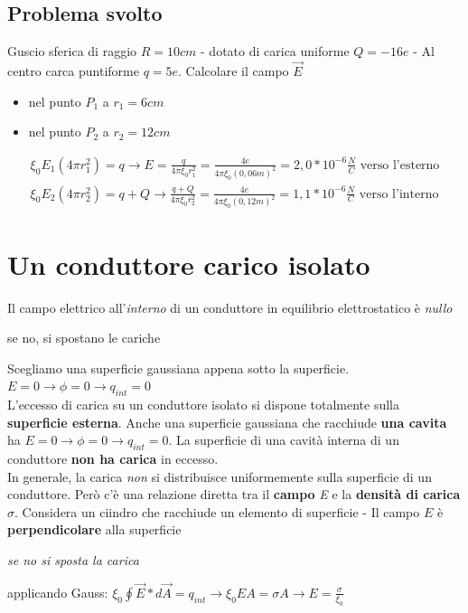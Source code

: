 \documentclass{book}
\begin{document}
\subsection{Problema svolto}
Guscio sferica di raggio $R=10cm$ - dotato di carica uniforme $Q=-16e$ - Al centro carca puntiforme $q=5e$. Calcolare il campo $\vec{E}$
\begin{itemize}
\item nel punto $P_1$ a $r_1=6cm$
\item nel punto $P_2$ a $r_2=12cm$
\end{itemize}
\begin{eqnarray*}
  \xi_0 E_1(4\pi r_1^2)=q\to E=\frac{q}{4\pi \xi_0 r^2_1}=\frac{4e}{4\pi \xi_0 (0,06m)^2}=2,0*10^{-6}\frac{N}{C} \text{ verso l'esterno}\\
  \xi_0 E_2 (4\pi r^2_2)=q+Q\to \frac{q+Q}{4\pi \xi_0 r^2_2}=\frac{4e}{4\pi \xi_0 (0,12m)^2}=1,1 *10^{-6}\frac{N}{C} \text{ verso l'interno}
\end{eqnarray*}
\section{Un conduttore carico isolato}
Il campo elettrico all'\textit{interno} di un conduttore in equilibrio elettrostatico è \textit{nullo}
\begin{center}
	se no, si spostano le cariche
\end{center}
Scegliamo una superficie gaussiana appena sotto la superficie. $E=0\to \phi=0\to q_{int}=0$\\
L'eccesso di carica su un conduttore isolato si dispone totalmente sulla
\textbf{superficie esterna}. Anche una superficie gaussiana che racchiude \textbf{una cavita} ha
$E=0 \to \phi=0\to q_{int}=0$. La superficie di una cavità interna di un conduttore \textbf{non ha carica} in eccesso.\\
In generale, la carica \textit{non} si distribuisce uniformemente sulla superficie di un conduttore. Però c'è una relazione diretta tra il \textbf{campo} \textit{E} e la \textbf{densità di carica} $\sigma$. Considera un ciindro che racchiude un elemento di superficie - Il campo $E$ è
\textbf {perpendicolare} alla superficie
\begin{center}
	{\it se no si sposta la carica}
\end{center}
applicando Gauss: $\xi_0 \oint \vec{E}*d\vec{A}=q_{int}\to \xi_0EA=\sigma A \to E=\frac{\sigma}{\xi_0}$
\end{document}
